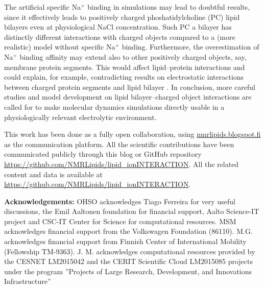 \documentclass[twoside,twocolumn,9pt]{article}
\begin{document}
The artificial specific Na$^+$ binding in simulations may lead to doubtful results, since it effectively leads  to
positively charged phoshatidylcholine (PC) lipid bilayers even at physiological NaCl concentration.
Such PC a bilayer has distinctly different interactions with charged objects compared to a (more realistic)
model without specific Na$^+$ binding. Furthermore, the overestimation of Na$^+$ binding affinity may
extend also to other positively charged objects, say, membrane protein segments. This would affect
lipid--protein interactions and could explain, for example, contradicting results on electrostatic interactions 
between charged protein segments and lipid bilayer \cite{arkhipov13,kaszuba15}. In conclusion, 
more careful studies and model development on lipid bilayer--charged object interactions are
called for to make molecular dynamics simulations directly usable in a physiologically relevant
electrolytic environment. 

This work has been done as a fully open collaboration, using
\url{nmrlipids.blogspot.fi} as the communication platform. All the
scientific contributions have been communicated publicly through
this blog or GitHub repository \url{https://github.com/NMRLipids/lipid_ionINTERACTION}.
All the related content and data is available at \url{https://github.com/NMRLipids/lipid_ionINTERACTION}.


{\bf Acknowledgements: }
OHSO acknowledges Tiago Ferreira for very useful discussions, the Emil Aaltonen foundation for financial support, Aalto Science-IT project and CSC-IT Center for Science for computational resources. 
%
MSM acknowledges financial support from the Volkswagen Foundation (86110).
%
M.G. acknowledges financial support from Finnish Center of International Mobility (Fellowship TM-9363).
%
J. M. acknowledges computational resources provided by the CESNET LM2015042 and the CERIT Scientific Cloud LM2015085 projects under the program ''Projects of Large Research, Development, and Innovations Infrastructure''
\end{document}
